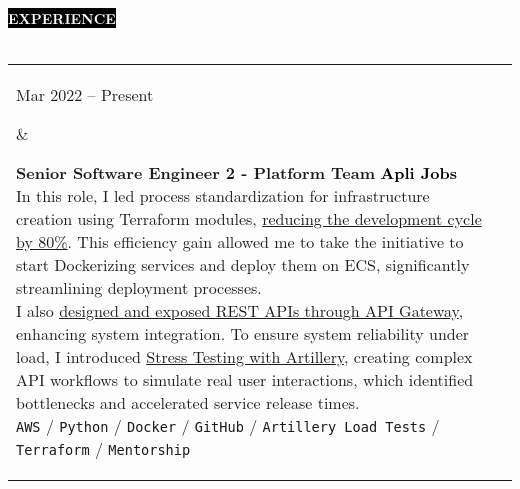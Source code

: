 \documentclass[10pt,A4]{article}
\makeatletter
\newcounter{a}
\newcounter{b}
\newcounter{c}
\newcommand{\cvsection}[1] {
	\textcolor{white}{\MakeUppercase{\textbf{#1}}}
}
\newcommand{\cvsect}[1]{
	\colorbox{black}{{\cvsection{#1}}}\\\\%
}
\newenvironment{entrylist}{%
	\begin{tabular*}{\textwidth}[t]{@{\extracolsep{\fill}}ll}
	}{%
	\end{tabular*}
}
\newcommand{\entry}[4]{%
	\parbox[t]{3.5cm}{%
		#1%
	}%
	&\parbox[t]{14cm}{%
		\textbf{#2}%
		\hfill%
		{\footnotesize \textbf{\textcolor{black}{#3}}}\\%
		#4%
	}\\\\}
\newcommand{\slashsep}{
	\hspace{2mm}/\hspace{2mm}
}
\makeatother
\begin{document}
	\cvsect{Experience}
	\begin{entrylist}
		\entry
		{Mar 2022 – Present}
		{Senior Software Engineer 2 - Platform Team}
		{Apli Jobs} %
		{In this role, I led process standardization for infrastructure creation using Terraform modules,
		\underline{reducing the development cycle by 80\%}. This efficiency gain allowed me to take the initiative to
		start Dockerizing services and deploy them on ECS, significantly streamlining deployment processes.\\
		\hfil\break
		I also \underline{designed and exposed REST APIs through API Gateway}, enhancing system integration. To ensure
		system reliability under load, I introduced \underline{Stress Testing with Artillery}, creating complex API
		workflows to simulate real user interactions, which identified bottlenecks and accelerated service
		release times.\\
			\texttt{AWS}\slashsep\texttt{Python}\slashsep\texttt{Docker}\slashsep\texttt{GitHub}\slashsep\texttt{Artillery Load Tests}\slashsep\texttt{Terraform}\slashsep\texttt{Mentorship}}
		\entry
		{Jan 2022 – Mar 2022}
		{Software Engineer - Cloud Team}
		{Apli Jobs}
		{As the first and only Cloud Engineer during my initial 6 months at Apli, I spearheaded the design
		and \underline{implementation of cloud-based architecture for cross-team projects}, collaborating with Data Science,
		Product, and Engineering teams. Utilizing AWS services such as EMR, ECS, DynamoDB, Lambda, AWS Backup,
		RDS, and Redis, I also successfully implemented cost optimization mechanisms that \underline{reduced the company's costs in around 10\% for the first year}.\\
		\hfil\break
		I initiated and led internal efforts to bolster company culture and enforce security protocols.
		I was a \underline{key member of the committee that introduced the on-call program} to the Engineering team, which
		resulted in a response time against incident of less than 4 hours. I also led the ISO audit and
		certification process for cloud infrastructure controls, ensuring our architecture met the highest standards of security, 
		scalability, and reliability, which culminated in achieving ISO 27k1.\\
		\hfil\break
		As the team expanded, \underline{I took on a mentor and leadership role}, establishing processes that improved
		code quality, including enhanced documentation, automated security checks in CI/CD, and regular
		knowledge-sharing meetings.\\
}
\end{entrylist}
\end{document}
